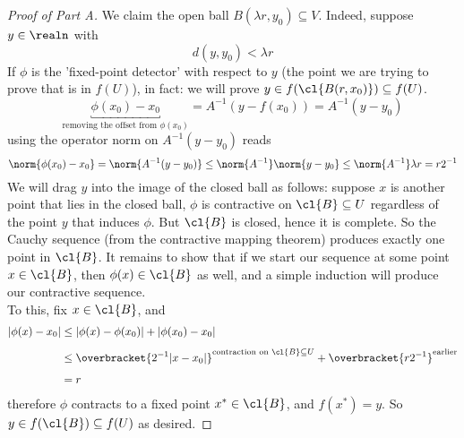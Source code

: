 \documentclass[../main-v2-manifolds.tex]{subfiles}
\begin{document}
\begin{proof}[Proof of Part A]
    We claim the open ball $B(\lambda r, y_0)\subseteq V$. Indeed, suppose $y\in\realn$ with 
    \[
        d(y,y_0) < \lambda r
    \]
    If $\phi$ is the 'fixed-point detector' with respect to $y$ (the point we are trying to prove that is in $f(U)$), in fact: we will prove $y\in f(\cl{B(r,x_0)})\subseteq f(U)$.
    \[
        \underbracket{\phi(x_0) - x_0}_{\text{removing the offset from }\phi(x_0)} = A^{-1}(y - f(x_0)) = A^{-1}(y - y_0)
    \]
    using the operator norm on $A^{-1}(y-y_0)$ reads
    \[
        \norm{\phi(x_0) - x_0} = \norm{A^{-1}(y-y_0)}\leq \norm{A^{-1}}\norm{y-y_0}\leq \norm{A^{-1}}\lambda r = r2^{-1}
    \]
    We will drag $y$ into the image of the closed ball as follows: suppose $x$ is another point that lies in the closed ball, $\phi$ is contractive on $\cl{B}\subseteq U$ regardless of the point $y$ that induces $\phi$. But $\cl{B}$ is closed, hence it is complete. So the Cauchy sequence (from the contractive mapping theorem) produces exactly one point in $\cl{B}$. It remains to show that if we start our sequence at some point $x\in \cl{B}$, then $\phi(x)\in\cl{B}$ as well, and a simple induction will produce our contractive sequence.\\


    To this, fix $x\in \cl{B}$, and 
    \begin{align*}
        |\phi(x)-x_0|&\leq |\phi(x)-\phi(x_0)| + |\phi(x_0)-x_0|\\[1ex]
        &\leq \overbracket{2^{-1}|x-x_0|}^{\text{contraction on } \cl{B}\subseteq U} + \overbracket{r2^{-1}}^{\text{earlier}} \\[1ex]
        &= r
    \end{align*}
    therefore $\phi$ contracts to a fixed point $x^*\in \cl{B}$, and $f(x^*)=y$. So $y\in f(\cl{B})\subseteq f(U)$ as desired.
\end{proof}
\end{document}
